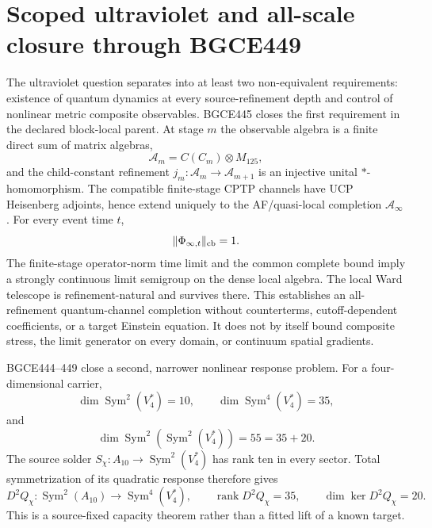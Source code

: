 \documentclass[11pt]{article}
\theoremstyle{definition}
\theoremstyle{remark}
\newcommand{\Sym}{\operatorname{Sym}}
\begin{document}
\section{Scoped ultraviolet and all-scale closure through BGCE449}\label{sec:uv083}

The ultraviolet question separates into at least two non-equivalent requirements: existence of quantum dynamics at every source-refinement depth and control of nonlinear metric composite observables. BGCE445 closes the first requirement in the declared block-local parent. At stage $m$ the observable algebra is a finite direct sum of matrix algebras,
\begin{equation}
 \mathcal A_m=C(C_m)\otimes M_{125},
\end{equation}
and the child-constant refinement $j_m:\mathcal A_m\to\mathcal A_{m+1}$ is an injective unital $*$-homomorphism. The compatible finite-stage CPTP channels have UCP Heisenberg adjoints, hence extend uniquely to the AF/quasi-local completion $\mathcal A_\infty$. For every event time $t$,
\begin{equation}
 \lVert\Phi_{\infty,t}\rVert_{\rm cb}=1.
\end{equation}
The finite-stage operator-norm time limit and the common complete bound imply a strongly continuous limit semigroup on the dense local algebra. The local Ward telescope is refinement-natural and survives there. This establishes an all-refinement quantum-channel completion without counterterms, cutoff-dependent coefficients, or a target Einstein equation. It does not by itself bound composite stress, the limit generator on every domain, or continuum spatial gradients.

BGCE444--449 close a second, narrower nonlinear response problem. For a four-dimensional carrier,
\begin{equation}
 \dim\Sym^2(V_4^*)=10,
 \qquad
 \dim\Sym^4(V_4^*)=35,
\end{equation}
and
\begin{equation}
 \dim\Sym^2\!\left(\Sym^2(V_4^*)\right)=55=35+20.
\end{equation}
The source solder $S_\chi:A_{10}\to\Sym^2(V_4^*)$ has rank ten in every sector. Total symmetrization of its quadratic response therefore gives
\begin{equation}
 D^2Q_\chi:\Sym^2(A_{10})\longrightarrow\Sym^4(V_4^*),
 \qquad \operatorname{rank}D^2Q_\chi=35,
 \qquad \dim\ker D^2Q_\chi=20.
\end{equation}
This is a source-fixed capacity theorem rather than a fitted lift of a known target.
\end{document}
